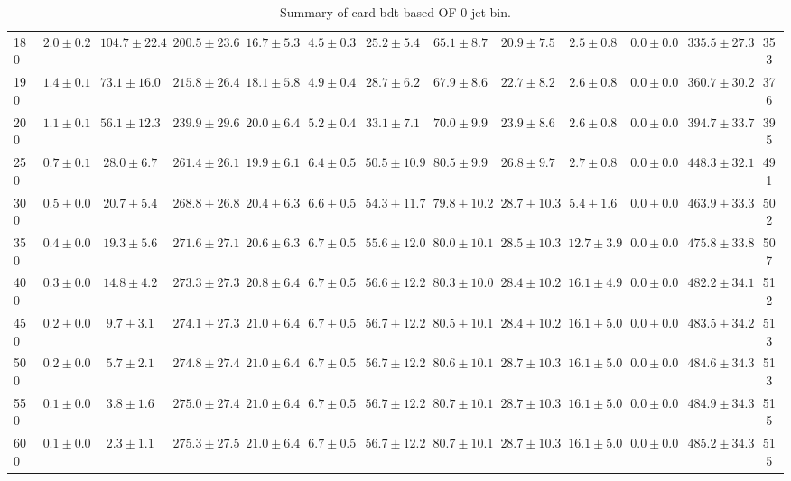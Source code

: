 \begin{table}
{\begin{center}
\begin{tabular}{l | c c | c c c c c c c c  | c c}
180 & $2.0\pm0.2$ & $104.7\pm22.4$ & $200.5\pm23.6$ & $16.7\pm5.3$ & $4.5\pm0.3$ & $25.2\pm5.4$ & $65.1\pm8.7$ & $20.9\pm7.5$ & $2.5\pm0.8$ & $0.0\pm0.0$ & $335.5\pm27.3$ & 353 \\
190 & $1.4\pm0.1$ & $73.1\pm16.0$ & $215.8\pm26.4$ & $18.1\pm5.8$ & $4.9\pm0.4$ & $28.7\pm6.2$ & $67.9\pm8.6$ & $22.7\pm8.2$ & $2.6\pm0.8$ & $0.0\pm0.0$ & $360.7\pm30.2$ & 376 \\
200 & $1.1\pm0.1$ & $56.1\pm12.3$ & $239.9\pm29.6$ & $20.0\pm6.4$ & $5.2\pm0.4$ & $33.1\pm7.1$ & $70.0\pm9.9$ & $23.9\pm8.6$ & $2.6\pm0.8$ & $0.0\pm0.0$ & $394.7\pm33.7$ & 395 \\
250 & $0.7\pm0.1$ & $28.0\pm6.7$ & $261.4\pm26.1$ & $19.9\pm6.1$ & $6.4\pm0.5$ & $50.5\pm10.9$ & $80.5\pm9.9$ & $26.8\pm9.7$ & $2.7\pm0.8$ & $0.0\pm0.0$ & $448.3\pm32.1$ & 491 \\
300 & $0.5\pm0.0$ & $20.7\pm5.4$ & $268.8\pm26.8$ & $20.4\pm6.3$ & $6.6\pm0.5$ & $54.3\pm11.7$ & $79.8\pm10.2$ & $28.7\pm10.3$ & $5.4\pm1.6$ & $0.0\pm0.0$ & $463.9\pm33.3$ & 502 \\
350 & $0.4\pm0.0$ & $19.3\pm5.6$ & $271.6\pm27.1$ & $20.6\pm6.3$ & $6.7\pm0.5$ & $55.6\pm12.0$ & $80.0\pm10.1$ & $28.5\pm10.3$ & $12.7\pm3.9$ & $0.0\pm0.0$ & $475.8\pm33.8$ & 507 \\
400 & $0.3\pm0.0$ & $14.8\pm4.2$ & $273.3\pm27.3$ & $20.8\pm6.4$ & $6.7\pm0.5$ & $56.6\pm12.2$ & $80.3\pm10.0$ & $28.4\pm10.2$ & $16.1\pm4.9$ & $0.0\pm0.0$ & $482.2\pm34.1$ & 512 \\
450 & $0.2\pm0.0$ & $9.7\pm3.1$ & $274.1\pm27.3$ & $21.0\pm6.4$ & $6.7\pm0.5$ & $56.7\pm12.2$ & $80.5\pm10.1$ & $28.4\pm10.2$ & $16.1\pm5.0$ & $0.0\pm0.0$ & $483.5\pm34.2$ & 513 \\
500 & $0.2\pm0.0$ & $5.7\pm2.1$ & $274.8\pm27.4$ & $21.0\pm6.4$ & $6.7\pm0.5$ & $56.7\pm12.2$ & $80.6\pm10.1$ & $28.7\pm10.3$ & $16.1\pm5.0$ & $0.0\pm0.0$ & $484.6\pm34.3$ & 513 \\
550 & $0.1\pm0.0$ & $3.8\pm1.6$ & $275.0\pm27.4$ & $21.0\pm6.4$ & $6.7\pm0.5$ & $56.7\pm12.2$ & $80.7\pm10.1$ & $28.7\pm10.3$ & $16.1\pm5.0$ & $0.0\pm0.0$ & $484.9\pm34.3$ & 515 \\
600 & $0.1\pm0.0$ & $2.3\pm1.1$ & $275.3\pm27.5$ & $21.0\pm6.4$ & $6.7\pm0.5$ & $56.7\pm12.2$ & $80.7\pm10.1$ & $28.7\pm10.3$ & $16.1\pm5.0$ & $0.0\pm0.0$ & $485.2\pm34.3$ & 515 \\
\hline
\end{tabular}
\end{center}
}
\caption{Summary of card bdt-based OF 0-jet bin.}
\end{table}
